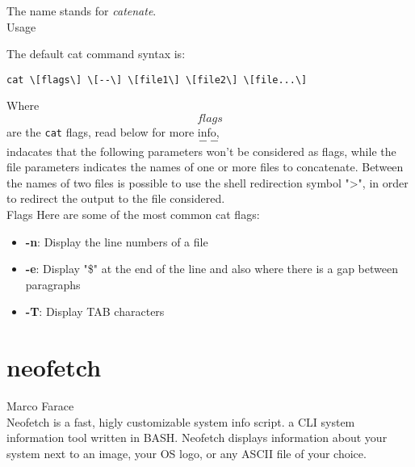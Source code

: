 \documentclass[hidelinks,12pt,a4paper,numbers=enddot]{scrartcl}
\begin{document}
The name stands for \emph{catenate}.\\

Usage

The default cat command syntax is:

\begin{verbatim}
cat \[flags\] \[--\] \[file1\] \[file2\] \[file...\]
\end{verbatim}

Where \[flags\] are the \texttt{cat} flags, read below for more info, \[--\] indacates that the
following parameters won't be considered as flags, while the file parameters indicates
the names of one or more files to concatenate.
Between the names of two files is possible to use the shell redirection symbol "\textgreater ",
in order to redirect the output to the file considered.\\

Flags
Here are some of the most common cat flags:

\begin{itemize}
   \item  \textbf{-n}: Display the line numbers of a file 
   \item  \textbf{-e}: Display "\$" at the end of the line and also where there is a gap between paragraphs 
   \item  \textbf{-T}: Display TAB characters 
\end{itemize}

\section{neofetch}


\large Marco Farace \normalsize\\





Neofetch is a fast, higly customizable system info script. a  CLI  system
information tool written in BASH. Neofetch displays information about your
system next to an image, your OS  logo, or any ASCII file of your choice.
\end{document}
